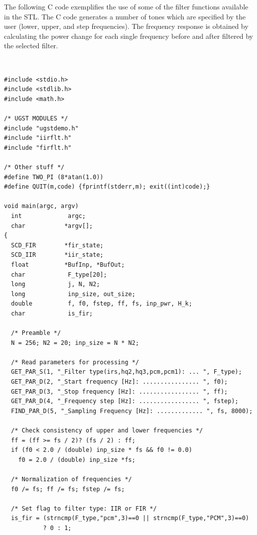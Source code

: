 The following C code exemplifies the use of some of the filter
functions available in the STL. The C code generates a number of tones
which are specified by the user (lower, upper, and step frequencies).
The frequency response is obtained by calculating the power change for
each single frequency before and after filtered by the selected
filter.

{\tt\small
\begin{verbatim}
#include <stdio.h>
#include <stdlib.h>
#include <math.h>

/* UGST MODULES */
#include "ugstdemo.h"
#include "iirflt.h"
#include "firflt.h"

/* Other stuff */
#define TWO_PI (8*atan(1.0))
#define QUIT(m,code) {fprintf(stderr,m); exit((int)code);}

void main(argc, argv)
  int             argc;
  char           *argv[];
{
  SCD_FIR        *fir_state;
  SCD_IIR        *iir_state;
  float          *BufInp, *BufOut;
  char            F_type[20];
  long            j, N, N2;
  long            inp_size, out_size;
  double          f, f0, fstep, ff, fs, inp_pwr, H_k;
  char            is_fir;

  /* Preamble */
  N = 256; N2 = 20; inp_size = N * N2;

  /* Read parameters for processing */
  GET_PAR_S(1, "_Filter type(irs,hq2,hq3,pcm,pcm1): ... ", F_type);
  GET_PAR_D(2, "_Start frequency [Hz]: ................ ", f0);
  GET_PAR_D(3, "_Stop frequency [Hz]: ................. ", ff);
  GET_PAR_D(4, "_Frequency step [Hz]: ................. ", fstep);
  FIND_PAR_D(5, "_Sampling Frequency [Hz]: ............. ", fs, 8000);

  /* Check consistency of upper and lower frequencies */
  ff = (ff >= fs / 2)? (fs / 2) : ff;
  if (f0 < 2.0 / (double) inp_size * fs && f0 != 0.0)
    f0 = 2.0 / (double) inp_size *fs;

  /* Normalization of frequencies */
  f0 /= fs; ff /= fs; fstep /= fs;

  /* Set flag to filter type: IIR or FIR */
  is_fir = (strncmp(F_type,"pcm",3)==0 || strncmp(F_type,"PCM",3)==0)
           ? 0 : 1;


\end{verbatim}}

